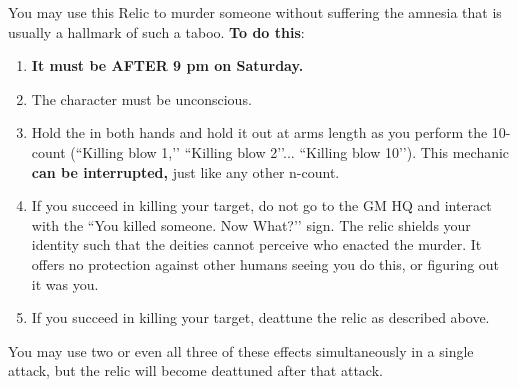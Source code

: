 \documentclass[green]{GL2020}
\begin{document}
You may use this Relic to murder someone without suffering the amnesia that is usually a hallmark of such a taboo. \textbf{To do this}:
\begin{enumerate}
  \item \textbf{It must be AFTER 9 pm on Saturday.}
  \item The character must be unconscious.
  \item Hold the \iScythe{} in both hands and hold it out at arms length as you perform the 10-count (``Killing blow 1,’’ ``Killing blow 2’’... ``Killing blow 10’’). This mechanic \textbf{can be interrupted,} just like any other n-count.
  \item If you succeed in killing your target, do not go to the GM HQ and interact with the ``You killed someone. Now What?’’ sign. The relic shields your identity such that the deities cannot perceive who enacted the murder. It offers no protection against other humans seeing you do this, or figuring out it was you.
  \item If you succeed in killing your target, deattune the relic as described above.
\end{enumerate}

You may use two or even all three of these effects simultaneously in a single attack, but the relic will become deattuned after that attack. 
\end{document}
